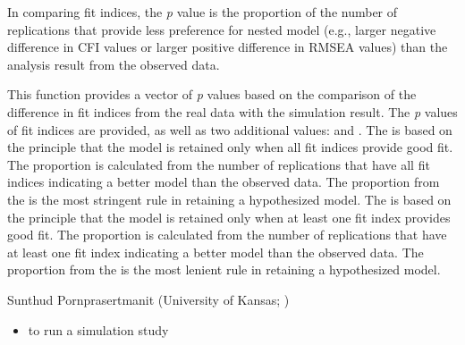 \documentclass[a4paper]{book}
\begin{document}
%
\begin{Details}\relax
In comparing fit indices, the \emph{p} value is the proportion of the number of replications that provide less preference for nested model (e.g., larger negative difference in CFI values or larger positive difference in RMSEA values) than the analysis result from the observed data. 
\end{Details}
%
\begin{Value}
This function provides a vector of \emph{p} values based on the comparison of the difference in fit indices from the real data with the simulation result. The \emph{p} values of fit indices are provided, as well as two additional values:  and . The  is based on the principle that the model is retained only when all fit indices provide good fit. The proportion is calculated from the number of replications that have all fit indices indicating a better model than the observed data. The proportion from the  is the most stringent rule in retaining a hypothesized model. The  is based on the principle that the model is retained only when at least one fit index provides good fit. The proportion is calculated from the number of replications that have at least one fit index indicating a better model than the observed data. The proportion from the  is the most lenient rule in retaining a hypothesized model.
\end{Value}
%
\begin{Author}\relax
Sunthud Pornprasertmanit (University of Kansas; )
\end{Author}
%
\begin{SeeAlso}\relax
\begin{itemize}


\item {} to run a simulation study


\end{itemize}

\end{SeeAlso}
%
\end{document}
